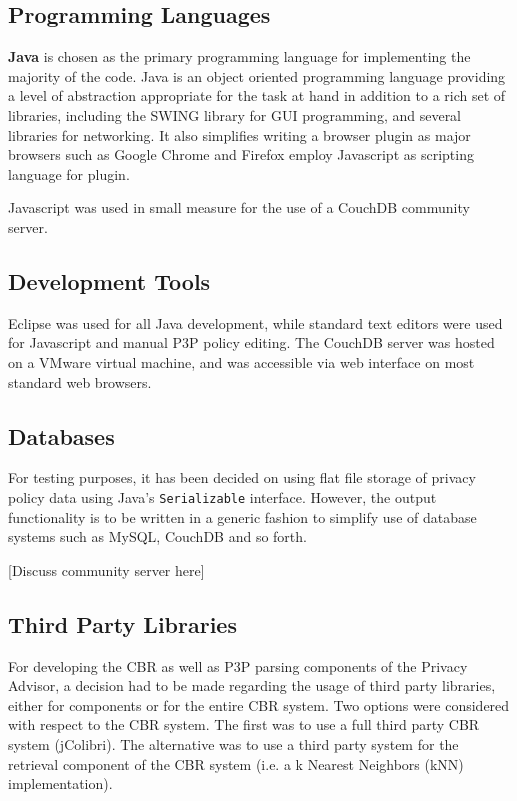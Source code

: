 \subsection{Programming Languages}
\textbf{Java} is chosen as the primary programming language for implementing the majority of the code. Java is an object oriented programming language providing a level of abstraction appropriate for the task at hand in addition to a rich set of libraries, including the SWING library for GUI programming, and several libraries for networking. It also simplifies writing a browser plugin as major browsers such as Google Chrome and Firefox employ Javascript as scripting language for plugin.

Javascript was used in small measure for the use of a CouchDB community server.

\subsection{Development Tools}
Eclipse was used for all Java development, while standard text editors were used for Javascript and manual P3P policy editing. The CouchDB server was hosted on a VMware virtual machine, and was accessible via web interface on most standard web browsers.

\subsection{Databases}
For testing purposes, it has been decided on using flat file storage of privacy policy data using Java's \texttt{Serializable} interface. However, the output functionality is to be written in a generic fashion to simplify use of database systems such as MySQL, CouchDB and so forth. 

[Discuss community server here]

\subsection{Third Party Libraries}
 
For developing the CBR as well as P3P parsing components of the Privacy Advisor, a decision had to be made regarding the usage of third party libraries, either for components or for the entire CBR system. Two options were considered with respect to the CBR system. The first was to use a full third party CBR system (jColibri). The alternative was to use a third party system for the retrieval component of the CBR system (i.e. a k Nearest Neighbors (kNN) implementation).


